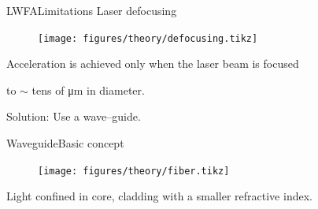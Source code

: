 \documentclass[dvipsnames]{beamer}
\begin{document}
\begin{frame}{LWFA}{Limitations}
Laser defocusing
\begin{figure}
\centering
\texttt{[image: figures/theory/defocusing.tikz]}
\end{figure}
Acceleration is achieved only when the laser beam is focused

to $\sim$ tens of \si{\um} in diameter.

Solution: Use a wave--guide.
\end{frame}
% 
\begin{frame}{Waveguide}{Basic concept}
 \begin{figure}
 \texttt{[image: figures/theory/fiber.tikz]}
  \end{figure}
  Light confined in core, cladding with a smaller refractive index.
\end{frame}
\end{document}
